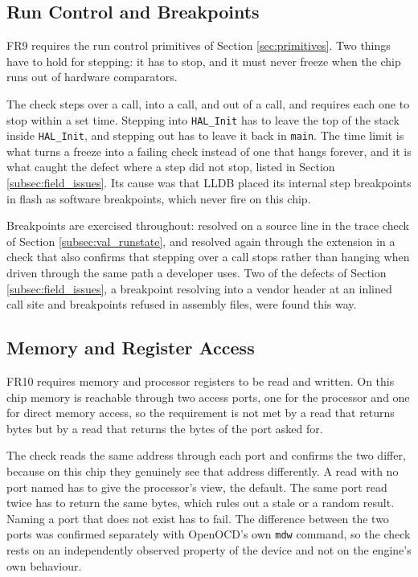 \subsection{Run Control and Breakpoints}
\label{subsec:val_runcontrol}
FR9 requires the run control primitives of Section \ref{sec:primitives}. Two things have to hold for stepping: it has to stop, and it must never freeze when the chip runs out of hardware comparators.

The check steps over a call, into a call, and out of a call, and requires each one to stop within a set time. Stepping into \texttt{HAL\_Init} has to leave the top of the stack inside \texttt{HAL\_Init}, and stepping out has to leave it back in \texttt{main}. The time limit is what turns a freeze into a failing check instead of one that hangs forever, and it is what caught the defect where a step did not stop, listed in Section \ref{subsec:field_issues}. Its cause was that LLDB placed its internal step breakpoints in flash as software breakpoints, which never fire on this chip.

Breakpoints are exercised throughout: resolved on a source line in the trace check of Section \ref{subsec:val_runstate}, and resolved again through the extension in a check that also confirms that stepping over a call stops rather than hanging when driven through the same path a developer uses. Two of the defects of Section \ref{subsec:field_issues}, a breakpoint resolving into a vendor header at an inlined call site and breakpoints refused in assembly files, were found this way.

\subsection{Memory and Register Access}
\label{subsec:val_memory}
FR10 requires memory and processor registers to be read and written. On this chip memory is reachable through two access ports, one for the processor and one for direct memory access, so the requirement is not met by a read that returns bytes but by a read that returns the bytes of the port asked for.

The check reads the same address through each port and confirms the two differ, because on this chip they genuinely see that address differently. A read with no port named has to give the processor's view, the default. The same port read twice has to return the same bytes, which rules out a stale or a random result. Naming a port that does not exist has to fail. The difference between the two ports was confirmed separately with OpenOCD's own \texttt{mdw} command, so the check rests on an independently observed property of the device and not on the engine's own behaviour.

